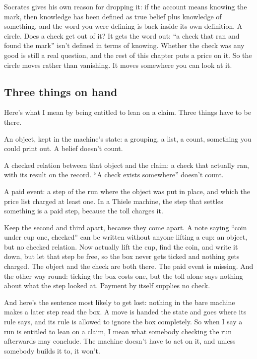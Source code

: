 \documentclass[11pt,twoside]{article}
\theoremstyle{thielethm}
\theoremstyle{thieledef}
\theoremstyle{thieledef}
\theoremstyle{thieledef}
\theoremstyle{thielethm}
\theoremstyle{thieleobs}
\theoremstyle{thielethm}
\begin{document}
Socrates gives his own reason for dropping it: if the account means knowing the mark, then knowledge has been defined as true belief plus knowledge of something, and the word you were defining is back inside its own definition. A circle. Does a check get out of it? It gets the word out: ``a check that ran and found the mark'' isn't defined in terms of knowing. Whether the check was any good is still a real question, and the rest of this chapter puts a price on it. So the circle moves rather than vanishing. It moves somewhere you can look at it.

\subsection{Three things on hand}

Here's what I mean by being entitled to lean on a claim. Three things have to be there.

An object, kept in the machine's state: a grouping, a list, a count, something you could print out. A belief doesn't count.

A checked relation between that object and the claim: a check that actually ran, with its result on the record. ``A check exists somewhere'' doesn't count.

A paid event: a step of the run where the object was put in place, and which the price list charged at least one. In a Thiele machine, the step that settles something is a paid step, because the toll charges it.

Keep the second and third apart, because they come apart. A note saying ``coin under cup one, checked'' can be written without anyone lifting a cup: an object, but no checked relation. Now actually lift the cup, find the coin, and write it down, but let that step be free, so the box never gets ticked and nothing gets charged. The object and the check are both there. The paid event is missing. And the other way round: ticking the box costs one, but the toll alone says nothing about what the step looked at. Payment by itself supplies no check.

And here's the sentence most likely to get lost: nothing in the bare machine makes a later step read the box. A move is handed the state and goes where its rule says, and its rule is allowed to ignore the box completely. So when I say a run is entitled to lean on a claim, I mean what somebody checking the run afterwards may conclude. The machine doesn't have to act on it, and unless somebody builds it to, it won't.
\end{document}
